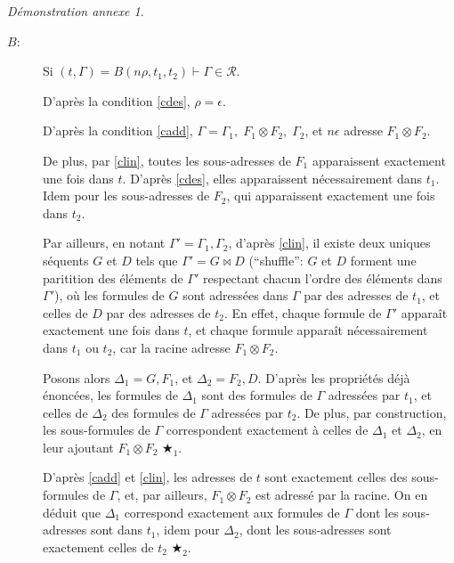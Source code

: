 \documentclass[11pt,a4paper]{article}
\theoremstyle{plain}
\theoremstyle{definition}
\theoremstyle{remark}
\newtheorem{demonstrationappendix}{Démonstration annexe}
\newcommand*{\tensor}{\otimes}
\newcommand*{\sequent}{\Gamma}
\newcommand*{\sequentbis}{\Delta}
\newcommand*{\representations}{\ensuremath{\mathcal{R}}}
\newcommand*{\setshuffle}{\bowtie}
\begin{document}
\begin{demonstrationappendix}
\begin{description}
        \item[$B$:] Si $(t, \sequent) = B(n\rho, t_1, t_2) \vdash \sequent \in \representations$.
    
        D'après la condition \ref{cdes}, $\rho = \epsilon$.
    
        D'après la condition \ref{cadd}, $\sequent = \sequent_1, \; F_1 \tensor F_2, \; \sequent_2$, et $n\epsilon$ adresse $F_1 \tensor F_2$. 
    
        De plus, par \ref{clin}, toutes les sous-adresses de $F_1$ apparaissent exactement une fois dans $t$. D'après \ref{cdes}, elles apparaissent nécessairement dans $t_1$. Idem pour les sous-adresses de $F_2$, qui apparaissent exactement une fois dans $t_2$.
    
        Par ailleurs, en notant $\sequent' = \sequent_1, \sequent_2$, d'après \ref{clin}, il existe deux uniques séquents $G$ et $D$ tels que $\sequent' = G \setshuffle  D$ (``shuffle'': $G$ et $D$ forment une paritition des éléments de $\sequent'$ respectant chacun l'ordre des éléments dans $\sequent'$), où les formules de $G$ sont adressées dans $\sequent$ par des adresses de $t_1$, et celles de $D$ par des adresses de $t_2$. En effet, chaque formule de $\sequent'$ apparaît exactement une fois dans $t$, et chaque formule apparaît nécessairement dans $t_1$ ou $t_2$, car la racine adresse $F_1 \tensor F_2$.
    
        Posons alors $\sequentbis_1 = G, F_1$, et $\sequentbis_2 = F_2, D$. D'après les propriétés déjà énoncées, les formules de $\sequentbis_1$ sont des formules de $\sequent$ adressées par $t_1$, et celles de $\sequentbis_2$ des formules de $\sequent$ adressées par $t_2$. De plus, par construction, les sous-formules de $\sequent$ correspondent exactement à celles de $\sequentbis_1$ et $\sequentbis_2$, en leur ajoutant $F_1 \tensor F_2$ $\bigstar_1$.
        
        D'après \ref{cadd} et \ref{clin}, les adresses de $t$ sont exactement celles des sous-formules de $\sequent$, et, par ailleurs, $F_1 \tensor F_2$ est adressé par la racine. On en déduit que $\sequentbis_1$ correspond exactement aux formules de $\sequent$ dont les sous-adresses sont dans $t_1$, idem pour $\sequentbis_2$, dont les sous-adresses sont exactement celles de $t_2$ $\bigstar_2$.
    

\end{description}
\end{demonstrationappendix}
\end{document}
